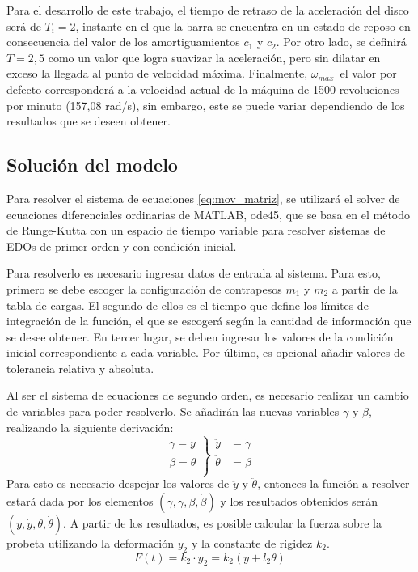 Para el desarrollo de este trabajo, el tiempo de retraso de la aceleración del disco será de $T_i=2$, instante en el que la barra se encuentra en un estado de reposo en consecuencia del valor de los amortiguamientos $c_1$ y $c_2$. Por otro lado, se definirá $T = 2,5$ como un valor que logra suavizar la aceleración, pero sin dilatar en exceso la llegada al punto de velocidad máxima. Finalmente, $\omega_{max}\,$ el valor por defecto corresponderá a la velocidad actual de la máquina de 1500 revoluciones por minuto (157,08 rad/s), sin embargo, este se puede variar dependiendo de los resultados que se deseen obtener. 

\subsection{Solución del modelo}
Para resolver el sistema de ecuaciones \ref{eq:mov_matriz}, se utilizará el solver de ecuaciones diferenciales ordinarias de MATLAB, ode45, que se basa en el método de Runge-Kutta con un espacio de tiempo variable para resolver sistemas de EDOs de primer orden y con condición inicial. \cite{ode45}

Para resolverlo es necesario ingresar datos de entrada al sistema. Para esto, primero se debe escoger la configuración de contrapesos $m_1$ y $m_2$ a partir de la tabla de cargas. El segundo de ellos es el tiempo que define los límites de integración de la función, el que se escogerá según la cantidad de información que se desee obtener. En tercer lugar, se deben ingresar los valores de la condición inicial correspondiente a cada variable. Por último, es opcional añadir valores de tolerancia relativa y absoluta.

Al ser el sistema de ecuaciones de segundo orden, es necesario realizar un cambio de variables para poder resolverlo. Se añadirán las nuevas variables $\gamma$ y $\beta$, realizando la siguiente derivación:
\[ \left. 
\begin{array}{ll}
	\gamma = \dot{y}\\
	\beta = \dot{\theta}\\
\end{array}
\right\}
\begin{array}{ll}
	\ddot{y} &= \dot{\gamma}\\
	\ddot{\theta} &= \dot{\beta}\\
\end{array}\]
Para esto es necesario despejar los valores de $\ddot{y}$ y $\ddot{\theta}$, entonces la función a resolver estará dada por los elementos $(\gamma, \dot{\gamma}, \beta, \dot{\beta})$ y los resultados obtenidos serán $(y, \dot{y}, \theta, \dot{\theta})$. A partir de los resultados, es posible calcular la fuerza sobre la probeta utilizando la deformación $y_2$ y la constante de rigidez $k_2$.
\begin{equation}\label{eq:fuerza_probeta}
	F(t) = k_2 \cdot y_2 = k_2(y + l_2\theta)
\end{equation}

